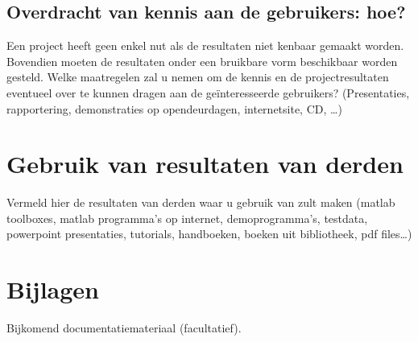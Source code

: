\documentclass[]{book}
\begin{document}
\subsection{Overdracht van kennis aan de gebruikers: hoe?}\label{sec:Overdracht}

Een project heeft geen enkel nut als de resultaten niet kenbaar gemaakt worden. Bovendien moeten de resultaten onder een bruikbare vorm beschikbaar worden gesteld. Welke maatregelen zal u nemen om de kennis en de projectresultaten eventueel over te kunnen dragen aan de ge\"interesseerde gebruikers? (Presentaties, rapportering, demonstraties op opendeurdagen, internetsite, CD, \ldots) 

\section{Gebruik van resultaten van derden}\label{sec:Gebruik}

Vermeld hier de resultaten van derden waar u gebruik van zult maken (matlab toolboxes, matlab programma's op internet, demoprogramma's, testdata, powerpoint presentaties, tutorials, handboeken, boeken uit bibliotheek, pdf files\ldots) 

\section{Bijlagen} \label{sec:Bijlagen}
Bijkomend documentatiemateriaal (facultatief). 
\end{document}
